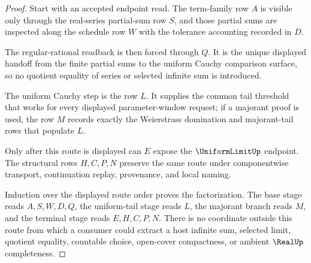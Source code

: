 \begin{proof}
Start with an accepted endpoint read. The term-family row $A$ is visible only through the real-series partial-sum row $S$, and those partial sums are inspected along the schedule row $W$ with the tolerance accounting recorded in $D$.

The regular-rational readback is then forced through $Q$. It is the unique displayed handoff from the finite partial sums to the uniform Cauchy comparison surface, so no quotient equality of series or selected infinite sum is introduced.

The uniform Cauchy step is the row $L$. It supplies the common tail threshold that works for every displayed parameter-window request; if a majorant proof is used, the row $M$ records exactly the Weierstrass domination and majorant-tail rows that populate $L$.

Only after this route is displayed can $E$ expose the $\UniformLimitUp$ endpoint. The structural rows $H,C,P,N$ preserve the same route under componentwise transport, continuation replay, provenance, and local naming.

Induction over the displayed route order proves the factorization. The base stage reads $A,S,W,D,Q$, the uniform-tail stage reads $L$, the majorant branch reads $M$, and the terminal stage reads $E,H,C,P,N$. There is no coordinate outside this route from which a consumer could extract a host infinite sum, selected limit, quotient equality, countable choice, open-cover compactness, or ambient $\RealUp$ completeness.
\end{proof}


\begin{closurestatus}{\UniformConvergenceSeriesUp}
  \theoryclosure{\seedClosure}
  \formalstatus{\unformalizedV}
\end{closurestatus}
